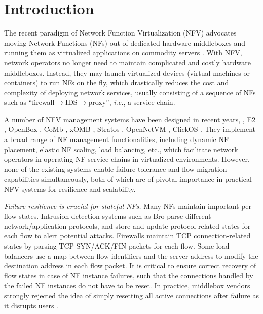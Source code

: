 \section{Introduction}


The recent paradigm of Network Function Virtualization (NFV) advocates moving
Network Functions (NFs) out of dedicated hardware middleboxes and running them as
virtualized applications on commodity servers \cite{nfv-white-paper}. With NFV, network
operators no longer need to maintain complicated and costly hardware middleboxes. Instead,
they may launch virtualized devices (virtual machines or containers) to run NFs on the fly, which
drastically reduces the cost and complexity of deploying network services, usually consisting of a sequence of NFs such as ``firewall$\rightarrow$IDS$\rightarrow$proxy'', {\em i.e.}, a service chain.

A number of NFV management systems have been designed in recent years, \eg, E2 \cite{palkar2015e2}, OpenBox \cite{bremler2015openbox}, CoMb
\cite{sekar2012design}, xOMB \cite{anderson2012xomb}, Stratos
\cite{gember2012stratos}, OpenNetVM \cite{hwang2015netvm, zhang2016opennetvm}, ClickOS \cite{martins2014clickos}. They implement a
broad range of NF management functionalities, including %
 dynamic NF placement, elastic NF scaling,
load balancing, etc., which facilitate network operators in operating NF service chains in virtualized environments. However, none of the existing systems enable failure
tolerance \cite{rajagopalan2013pico, sherry2015rollback} and flow migration \cite{gember2015opennf, rajagopalan2013split, khalid2016paving} capabilities simultaneously, both of which are of pivotal importance in practical NFV systems for resilience and scalability.


{\em Failure resilience is crucial for stateful NFs.}  Many NFs maintain important per-flow states. Intrusion
detection systems such as Bro \cite{bro} parse different network/application
protocols, and store and update protocol-related 
states for each flow to alert potential attacks. Firewalls \cite{firewall}
maintain TCP connection-related states by parsing TCP SYN/ACK/FIN packets for
each flow. Some load-balancers \cite{lvs} use a map between flow identifiers and
the server address to modify the destination address in each flow packet. 
It is critical to ensure correct recovery of flow states in case of NF instance failures, such that the connections handled by the failed NF instances do not have to be reset. In practice, middlebox vendors
strongly rejected the idea of simply resetting all active connections after failure as it
disrupts users \cite{sherry2015rollback}.

